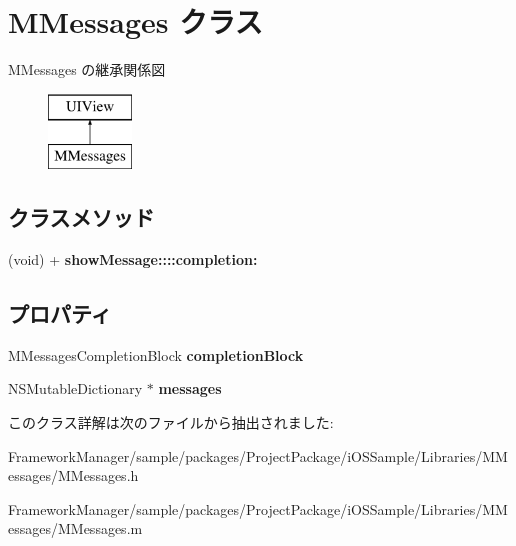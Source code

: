 \hypertarget{interface_m_messages}{}\section{M\+Messages クラス}
\label{interface_m_messages}
M\+Messages の継承関係図\begin{figure}[H]
\begin{center}
\leavevmode
\includegraphics[height=2.000000cm]{interface_m_messages}
\end{center}
\end{figure}
\subsection*{クラスメソッド}
\begin{DoxyCompactItemize}
\item 
\hypertarget{interface_m_messages_a42868ed042e4f4479ad2890ed85bfcd0}{}(void) + {\bfseries show\+Message\+::::completion\+:}\label{interface_m_messages_a42868ed042e4f4479ad2890ed85bfcd0}

\end{DoxyCompactItemize}
\subsection*{プロパティ}
\begin{DoxyCompactItemize}
\item 
\hypertarget{interface_m_messages_a04cf6c83a51a64faf692da91c09bdf50}{}M\+Messages\+Completion\+Block {\bfseries completion\+Block}\label{interface_m_messages_a04cf6c83a51a64faf692da91c09bdf50}

\item 
\hypertarget{interface_m_messages_a477a34ab05c931606d98401d1121d165}{}N\+S\+Mutable\+Dictionary $\ast$ {\bfseries messages}\label{interface_m_messages_a477a34ab05c931606d98401d1121d165}

\end{DoxyCompactItemize}


このクラス詳解は次のファイルから抽出されました\+:\begin{DoxyCompactItemize}
\item 
Framework\+Manager/sample/packages/\+Project\+Package/i\+O\+S\+Sample/\+Libraries/\+M\+Messages/M\+Messages.\+h\item 
Framework\+Manager/sample/packages/\+Project\+Package/i\+O\+S\+Sample/\+Libraries/\+M\+Messages/M\+Messages.\+m\end{DoxyCompactItemize}
